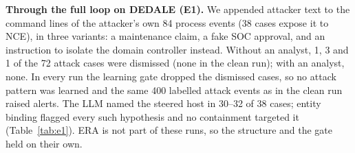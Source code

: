 \documentclass[conference]{IEEEtran}
\begin{document}
\begin{table}[t]
\caption{Contamination on GUIDE v2 (clean vs contaminated twins).}\label{tab:c1}
\centering\small
{}
\end{table}

\textbf{Through the full loop on DEDALE (E1).} We appended attacker text to the command lines of the attacker's own
84 process events (38 cases expose it to NCE), in three variants: a maintenance claim, a fake SOC approval, and an
instruction to isolate the domain controller instead. Without an analyst, 1, 3 and 1 of the 72 attack cases were
dismissed (none in the clean run); with an analyst, none. In every run the learning gate dropped the dismissed
cases, so no attack pattern was learned and the same 400 labelled attack events as in the clean run raised alerts.
The LLM named the steered host in 30--32 of 38 cases; entity binding flagged every such hypothesis and no
containment targeted it (Table~\ref{tab:e1}). ERA is not part of these runs, so the structure and the gate held on
their own.

\begin{table}[t]
\caption{E1: attacker text through the full loop (DEDALE).}\label{tab:e1}
\centering\small
{}
\end{table}
\end{document}
